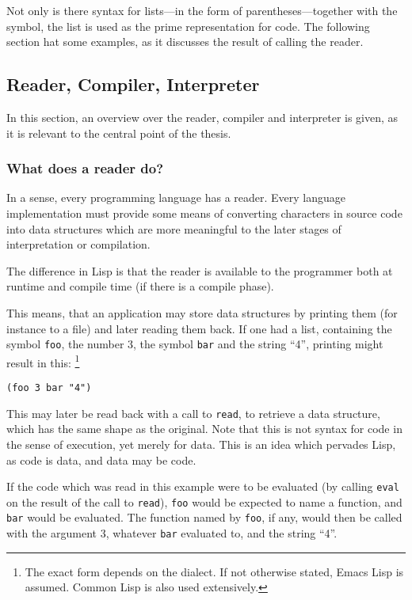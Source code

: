 \documentclass[a4paper]{article}
\begin{document}
Not only is there syntax for lists---in the form of parentheses---together with
the symbol, the list is used as the prime representation for code.  The
following section hat some examples, as it discusses the result of calling the
reader.

\subsection{Reader, Compiler, Interpreter}
\label{sec:orgheadline16}
In this section, an overview over the reader, compiler and interpreter is given,
as it is relevant to the central point of the thesis.

\subsubsection{What does a reader do?}
\label{sec:orgheadline15}
In a sense, every programming language has a reader.  Every language
implementation must provide some means of converting characters in source code
into data structures which are more meaningful to the later stages of
interpretation or compilation.

The difference in Lisp is that the reader is available to the programmer both at
runtime and compile time (if there is a compile phase).

This means, that an application may store data structures by printing them (for
instance to a file) and later reading them back.  If one had a list, containing
the symbol \texttt{foo}, the number 3, the symbol \texttt{bar} and the
string ``4'', printing might result in this: \footnote{The exact form depends on the
dialect.  If not otherwise stated, Emacs Lisp is assumed.  Common Lisp is also used
extensively.}

\begin{verbatim}
(foo 3 bar "4")
\end{verbatim}

This may later be read back with a call to \texttt{read}, to retrieve a data
structure, which has the same shape as the original.  Note that this is not
syntax for code in the sense of execution, yet merely for data.  This is an idea
which pervades Lisp, as code is data, and data may be code.

If the code which was read in this example were to be evaluated (by calling
\texttt{eval} on the result of the call to \texttt{read}), \texttt{foo}
would be expected to name a function, and \texttt{bar} would be evaluated.
The function named by \texttt{foo}, if any, would then be called with the
argument 3, whatever \texttt{bar} evaluated to, and the string ``4''.
\end{document}
